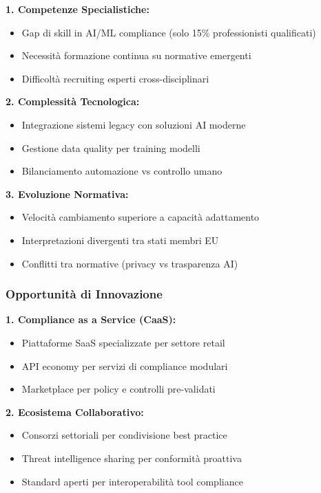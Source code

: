 \textbf{1. Competenze Specialistiche:}
\begin{itemize}
    \item Gap di skill in AI/ML compliance (solo 15\% professionisti qualificati)
    \item Necessità formazione continua su normative emergenti
    \item Difficoltà recruiting esperti cross-disciplinari
\end{itemize}

\textbf{2. Complessità Tecnologica:}
\begin{itemize}
    \item Integrazione sistemi legacy con soluzioni AI moderne
    \item Gestione data quality per training modelli
    \item Bilanciamento automazione vs controllo umano
\end{itemize}

\textbf{3. Evoluzione Normativa:}
\begin{itemize}
    \item Velocità cambiamento superiore a capacità adattamento
    \item Interpretazioni divergenti tra stati membri EU
    \item Conflitti tra normative (privacy vs trasparenza AI)
\end{itemize}

\subsubsection{\texorpdfstring{Opportunità di Innovazione}{4.8.4.2 - Opportunità di Innovazione}}

\textbf{1. Compliance as a Service (CaaS):}
\begin{itemize}
    \item Piattaforme SaaS specializzate per settore retail
    \item API economy per servizi di compliance modulari
    \item Marketplace per policy e controlli pre-validati
\end{itemize}

\textbf{2. Ecosistema Collaborativo:}
\begin{itemize}
    \item Consorzi settoriali per condivisione best practice
    \item Threat intelligence sharing per conformità proattiva
    \item Standard aperti per interoperabilità tool compliance
\end{itemize}

